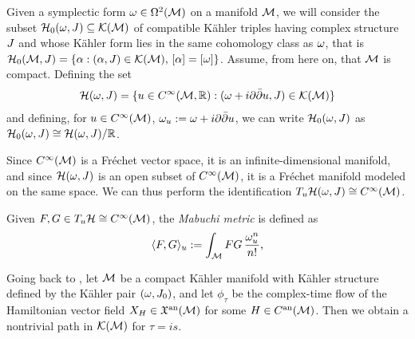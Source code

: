 \documentclass[notas.tex]{subfiles} 				%
\begin{document}
Given a symplectic form $\omega \in \Omega^2(\mathcal{M})$ on a manifold $\mathcal{M}$, we will consider the subset $\mathcal{H}_0(\omega, J) \subseteq \mathcal{K}(\mathcal{M})$ of compatible Kähler triples having complex structure $J$ and whose Kähler form lies in the same cohomology class as $\omega$, that is $\mathcal{H}_0(\mathcal{M}, J) = \{\alpha : (\alpha,J) \in \mathcal{K}(\mathcal{M}), \, [\alpha] = [\omega]\}$.
Assume, from here on, that $\mathcal{M}$ is compact. Defining the set 
\begin{align*}
	\mathcal{H}(\omega, J) = \{u \in C^\infty(\mathcal{M},\mathbb{R}): (\omega + i \partial \bar{\partial} u, J) \in \mathcal{K}(\mathcal{M}) \} 
\end{align*}
and defining, for $u \in C^\infty(\mathcal{M})$, $\omega_u :=  \omega + i \partial \bar{\partial} u$, we can write $\mathcal{H}_0(\omega, J)$ as $\mathcal{H}_0(\omega, J) \cong \mathcal{H}(\omega, J) / \mathbb{R}$.
\begin{rem}
	Since $C^\infty(\mathcal{M})$ is a Fréchet vector space, it is an infinite-dimensional manifold, and since $\mathcal{H}(\omega, J)$ is an open subset of $C^\infty(\mathcal{M})$, it is a Fréchet manifold modeled on the same space. We can thus perform the identification $T_u \mathcal{H}(\omega, J) \cong C^\infty(\mathcal{M})$.
\end{rem}

\begin{defn}
	Given $F,G \in T_u \mathcal{H} \cong C^\infty(\mathcal{M})$, the \emph{Mabuchi metric} is defined as
	\begin{align*}
		\langle F,G \rangle_u := \int_{\mathcal{M}} FG \, \frac{\omega_u^n}{n!},
	\end{align*}
\end{defn}

\begin{rem} \label{rem_symplectic_picture}
	Going back to , let $\mathcal{M}$ be a compact Kähler manifold with Kähler structure defined by the Kähler pair $(\omega, J_0)$, and let $\phi_\tau$ be the complex-time flow of the Hamiltonian vector field $X_H \in \mathfrak{X}^{\text{an}}(\mathcal{M})$ for some $H \in C^{\text{an}}(\mathcal{M})$. Then we obtain a nontrivial path in $\mathcal{K}(\mathcal{M})$ for $\tau = is$. 
\end{rem}
\end{document}
